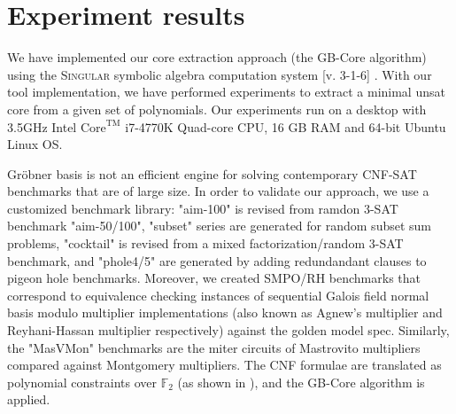\section{Experiment results}
We have implemented our core extraction approach (the GB-Core
algorithm) using the \textsc{Singular} symbolic
algebra computation system [v. 3-1-6] \cite{DGPS}. With our
tool implementation, we have performed experiments to extract a
minimal unsat core from a given set of  
polynomials. Our experiments run on a desktop with
3.5GHz Intel $\text{Core}^\text{TM}$ i7-4770K Quad-core CPU, 16 GB RAM and
64-bit Ubuntu Linux OS.

Gr\"obner basis is not an efficient engine for solving contemporary
CNF-SAT benchmarks that are of large size. In order to validate our
approach, we use a customized  benchmark library: "aim-100" is revised
from ramdon 3-SAT benchmark "aim-50/100", "subset" series are generated for
random subset sum problems, "cocktail" is revised from a mixed
factorization/random 3-SAT benchmark, and "phole4/5" are generated by
adding redundandant clauses to pigeon hole benchmarks. Moreover, we
created SMPO/RH benchmarks that correspond to
equivalence checking instances of sequential Galois field normal basis
modulo multiplier implementations (also known as Agnew's multiplier \cite{SMPO}
and Reyhani-Hassan multiplier \cite{RHmulti} respectively) against the golden model spec. 
Similarly, the "MasVMon" benchmarks are the miter circuits of
 Mastrovito multipliers compared against  Montgomery
multipliers. The CNF formulae are translated as polynomial constraints
over $\mathbb{F}_2$ (as shown in \cite{condrat-tacas07}), and the
GB-Core algorithm is applied. 

